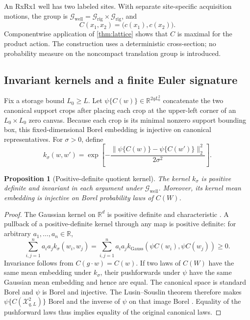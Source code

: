 \documentclass[11pt]{article}
\newtheorem{proposition}[theorem]{Proposition}
\theoremstyle{definition}
\theoremstyle{remark}
\newcommand{\cX}{\mathcal X}
\newcommand{\cG}{\mathcal G}
\newcommand{\bR}{\mathbb R}
\newcommand{\1}{\mathbf 1}
\begin{document}
An RxRx1 well has two labeled sites.  With separate site-specific
acquisition motions, the group is
\(\cG_{\mathrm{well}}=\cG_{\mathrm{rig}}\times\cG_{\mathrm{rig}}\), and
\begin{equation}\label{eq:well-code}
  C(x_1,x_2)=\bigl(c(x_1),c(x_2)\bigr).
\end{equation}
Componentwise application of \cref{thm:lattice} shows that \(C\) is maximal for
the product action.  The construction uses a deterministic cross-section; no
probability measure on the noncompact translation group is introduced.

\subsection{Invariant kernels and a finite Euler signature}

Fix a storage bound \(L_0\ge L\).  Let
\(\psi\{C(w)\}\in\bR^{2qL_0^2}\) concatenate the two canonical support crops
after placing each crop at the upper-left corner of an \(L_0\times L_0\) zero
canvas.  Because each crop is its minimal nonzero support bounding box, this
fixed-dimensional Borel embedding is injective on canonical representatives.
For \(\sigma>0\), define
\begin{equation}\label{eq:canonical-kernel}
 k_{\sigma}(w,w')
 =
 \exp\left[-\frac{\|\psi\{C(w)\}-\psi\{C(w')\}\|_2^2}{2\sigma^2}\right].
\end{equation}

\begin{proposition}[Positive-definite quotient kernel]\label{prop:kernel}
The kernel \(k_\sigma\) is positive definite and invariant in each argument
under \(\cG_{\mathrm{well}}\).  Moreover, its kernel mean embedding is
injective on Borel probability laws of \(C(W)\).
\end{proposition}

\begin{proof}
The Gaussian kernel on \(\bR^d\) is positive definite and characteristic
\citep{sriperumbudur2010hilbert}.  A pullback of a positive-definite kernel
through any map is positive definite: for arbitrary \(a_1,\ldots,a_n\in\bR\),
\[
 \sum_{i,j=1}^n a_i a_j k_\sigma(w_i,w_j)
 =
 \sum_{i,j=1}^n a_i a_j
 k_{\mathrm{Gauss}}\!\left(\psi C(w_i),\psi C(w_j)\right)\ge 0.
\]
Invariance follows from \(C(g\cdot w)=C(w)\).  If two laws of \(C(W)\) have
the same mean embedding under \(k_\sigma\), their pushforwards under \(\psi\)
have the same Gaussian mean embedding and hence are equal.  The canonical
space is standard Borel and \(\psi\) is Borel and injective.  The
Lusin--Souslin theorem therefore makes \(\psi\{C(\cX_{q,L}^2)\}\) Borel and
the inverse of \(\psi\) on that image Borel
\citep[Theorem 15.1]{kechris1995classical}.  Equality of the pushforward laws
thus implies equality of the original canonical laws.
\end{proof}
\end{document}
